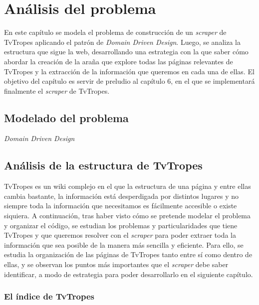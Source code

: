 \chapter{Análisis del problema}
En este capítulo se modela el problema de construcción de un \textit{scraper} de
TvTropes aplicando el patrón de \textit{Domain Driven Design}. Luego, se analiza
la estructura que sigue la web, desarrollando una estrategia con la que saber
cómo abordar la creación de la araña que explore todas las páginas relevantes de
TvTropes y la extracción de la información que queremos en cada una de ellas. El
objetivo del capítulo es servir de preludio al capítulo 6, en el que se
implementará finalmente el \textit{scraper} de TvTropes.

\section{Modelado del problema}

\textit{Domain Driven Design}

\section{Análisis de la estructura de TvTropes}
TvTropes es un wiki complejo en el que la estructura de una página y entre ellas
cambia bastante, la información está desperdigada por distintos lugares y no
siempre toda la información que necesitamos es fácilmente accesible o existe
siquiera. A continuación, tras haber visto cómo se pretende modelar el problema
y organizar el código, se estudian los problemas y particularidades que tiene
TvTropes y que queremos resolver con el \textit{scraper} para poder extraer toda
la información que sea posible de la manera más sencilla y eficiente. Para ello,
se estudia la organización de las páginas de TvTropes tanto entre sí como dentro
de ellas, y se observan los puntos más importantes que el \textit{scraper} debe
saber identificar, a modo de estrategia para poder desarrollarlo en el siguiente
capítulo.

\subsection{El índice de TvTropes}

